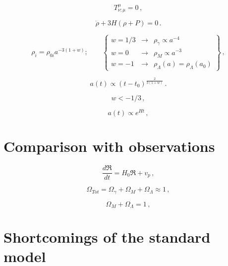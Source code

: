 \begin{equation}
T^{\mu}_{\nu;\mu} =0  \, ,
\label{equation:1.3.19}
\end{equation}

\begin{equation}
\dot{\rho}+3H(\rho+P)=0 \, .
\label{equation:1.3.20}
\end{equation}

\begin{equation}
\rho_i = \rho_{0i} a^{-3 (1+w)}; \qquad \left \{
\begin{array}{lll}w =1/3 & \longrightarrow & \rho_{\gamma} \propto a^{-4}\\
w=0 & \longrightarrow & \rho_M \propto a^{-3}\\
w =-1 & \longrightarrow & \rho_{\Lambda}(a)=\rho_{\Lambda}(a_0)\end{array}\right \} \, ,
\label{equation:1.3.21}
\end{equation}

\begin{equation}
a(t) \propto (t-t_0)^{\frac{2}{3(1+w)}}\, .
\label{equation:1.3.22}
\end{equation}

\begin{equation}
w <-1/3 \, ,
\label{equation:1.3.23}
\end{equation}
 
\begin{equation}
a(t) \propto e^{Ht} \, ,
\label{equation:1.3.24}
\end{equation}

\section{Comparison with observations}
\label{section:1.4}

\begin{equation}
\frac{d \mathfrak{R}}{dt}=H_0\mathfrak{R}+v_p \, ,
\label{equation:1.4.1}
\end{equation}

\begin{equation}
\Omega_{Tot} = \Omega_{\gamma} + \Omega_M + \Omega_{\Lambda} \approx 1 \, ,
\label{equation:1.4.2}
\end{equation}

\begin{equation}
\Omega_M + \Omega_{\Lambda} = 1 \, ,
\label{equation:1.4.3}
\end{equation}

\section{Shortcomings of the standard model}
\label{section:1.5}

